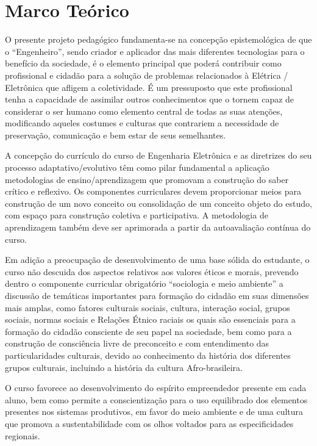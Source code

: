 \chapter{Marco Teórico}
\label{cap:tres}

O presente projeto pedagógico fundamenta-se na concepção epistemológica de que o “Engenheiro”, sendo criador e aplicador das mais diferentes tecnologias para o benefício da sociedade, é o elemento principal que poderá contribuir como profissional e cidadão para a solução de problemas relacionados à Elétrica / Eletrônica que afligem a coletividade. É um pressuposto que este profissional tenha a capacidade de assimilar outros conhecimentos que o tornem capaz de considerar o ser humano como elemento central de todas as suas atenções, modificando aqueles costumes e culturas que contrariem a necessidade de preservação, comunicação e bem estar de seus semelhantes.

A concepção do currículo do curso de Engenharia Eletrônica e as diretrizes do seu processo adaptativo/evolutivo têm como pilar fundamental a aplicação metodologias de ensino/aprendizagem que promovam a construção do saber crítico e reflexivo. Os componentes curriculares devem proporcionar meios para construção de um novo conceito ou consolidação de um conceito objeto do estudo, com espaço para construção coletiva e participativa.  A metodologia de aprendizagem também deve ser aprimorada a partir da autoavaliação contínua do curso.

Em adição a preocupação de desenvolvimento de uma base sólida do estudante, o curso não descuida dos aspectos relativos aos valores éticos e morais, prevendo dentro o componente curricular obrigatório “sociologia e meio ambiente” a discussão de temáticas importantes para formação do cidadão em suas dimensões mais amplas, como fatores culturais sociais, cultura, interação social, grupos sociais,  normas sociais e Relações Étnico raciais os quais são essenciais para a formação do cidadão consciente de seu papel na sociedade, bem como para a construção de consciência livre de preconceito e com entendimento das particularidades culturais, devido ao conhecimento da história dos diferentes grupos culturais, incluindo a história da cultura Afro-brasileira.

O curso favorece ao desenvolvimento do espírito empreendedor presente em cada aluno, bem como permite a conscientização para o uso equilibrado dos elementos presentes nos sistemas produtivos, em favor do meio ambiente e de uma cultura que promova a sustentabilidade com os olhos voltados para as especificidades regionais.

